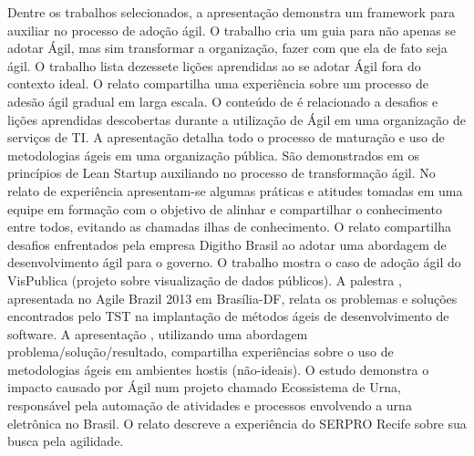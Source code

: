 Dentre os trabalhos selecionados, a apresentação\cite{Ahmed2008} demonstra um framework para auxiliar no processo de adoção ágil. O trabalho \cite{Sahota2012} cria um guia para não apenas se adotar Ágil, mas sim transformar a organização, fazer com que ela de fato seja ágil. O trabalho \cite{Piegas2012} lista dezessete lições aprendidas ao se adotar Ágil fora do contexto ideal. O relato \cite{Parzinello2012} compartilha uma experiência sobre um processo de adesão ágil gradual em larga escala. O conteúdo de \cite{Srinath2012} é relacionado a desafios e lições aprendidas descobertas durante a utilização de Ágil em uma organização de serviços de TI. A apresentação \cite{Karaj2013} detalha todo o processo de maturação e uso de metodologias ágeis em uma organização pública. São demonstrados em \cite{Hui2013} os princípios de Lean Startup auxiliando no processo de transformação ágil. No relato de experiência \cite{Valerio2013} apresentam-se algumas práticas e atitudes tomadas em uma equipe em formação com o objetivo de alinhar e compartilhar o conhecimento entre todos, evitando as chamadas ilhas de conhecimento. O relato \cite{Stefano2013} compartilha desafios enfrentados pela empresa Digitho Brasil ao adotar uma abordagem de desenvolvimento ágil para o governo. O trabalho \cite{Rodrigues2013} mostra o caso de adoção ágil do VisPublica (projeto sobre visualização de dados públicos). A palestra \cite{Vieira2013}, apresentada no Agile Brazil 2013 em Brasília-DF, relata os problemas e soluções encontrados pelo TST na implantação de métodos ágeis de desenvolvimento de software. A apresentação \cite{Queiroz2013}, utilizando uma abordagem problema/solução/resultado, compartilha experiências sobre o uso de metodologias ágeis em ambientes hostis (não-ideais). O estudo \cite{Bastos2013} demonstra o impacto causado por Ágil num projeto chamado Ecossistema de Urna, responsável pela automação de atividades e processos envolvendo a urna eletrônica no Brasil. O relato \cite{Maciel2013} descreve a experiência do SERPRO Recife sobre sua busca pela agilidade.

%
